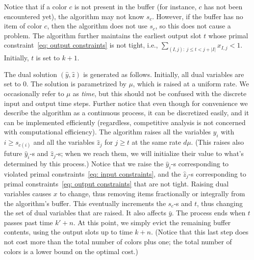 \documentclass[12pt]{article}
\begin{document}
Notice that if a color $c$ is not present in the buffer (for
instance, $c$ has not been encountered yet), the algorithm
may not know $s_c$. However, if the buffer has no item of
color $c$, then the algorithm does not use $s_c$, so this
does not cause a problem. The algorithm further maintains
the  earliest output slot $t$ whose primal
constraint~\eqref{eq: output constraints} is not tight, i.e.,
$\sum_{(I,j):\ j\le t < j+|I|} x_{I,j} < 1$.
Initially, $t$ is set to $k+1$.

The dual solution $(\hat{y},\hat{z})$ is generated as
follows. Initially, all dual variables are set to $0$. The
solution is parametrized by $\mu$, which is raised at
a uniform rate. We occasionally refer to $\mu$ as
{\em time}, but this should not be confused with the
discrete input and output time steps. Further notice
that even though for convenience we describe the
algorithm as a continuous process, it can be discretized
easily, and it can be implemented 
efficiently (regardless, competitive analysis is not concerned
with computational efficiency). 
The algorithm raises all the variables
$\hat{y}_i$ with $i\ge s_{c(i)}$ and all the variables
$\hat{z}_j$ for $j\ge t$ at the same rate $d\mu$.
(This raises also future $\hat{y}_i$-s and $\hat{z}_j$-s; when 
we reach them, we will initialize their value to what's determined
by this process.)
Notice that we raise the $\hat{y}_i$-s corresponding to
violated primal constraints~\eqref{eq: input constraints},
and the $\hat{z}_j$-s corresponding to primal
constraints~\eqref{eq: output constraints} that are not tight.
Raising dual variables causes $x$ to change, thus removing items
fractionally or integrally from the algorithm's buffer. This eventually
increments the $s_c$-s and $t$, thus changing the set of dual variables that
are raised. It also affects $\bar{y}$. The process ends when $t$
passes past time $k'+n$. At this point, we simply evict the remaining
buffer contents, using the output slots up to time $k+n$.
(Notice that this last step does not cost more than the total
number of colors plus one; the total number of colors is a lower 
bound on the optimal cost.)
\end{document}
